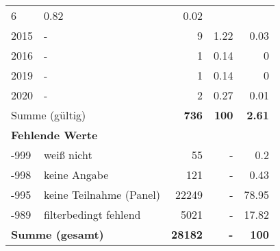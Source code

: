 \begin{longtable}{lXrrr}
       \num{6} &
       \num[round-mode=places,round-precision=2]{0.82} &
         \num[round-mode=places,round-precision=2]{0.02} \\

     2015 &
     \multicolumn{1}{X}{ -  } &


       \num{9} &
       \num[round-mode=places,round-precision=2]{1.22} &
         \num[round-mode=places,round-precision=2]{0.03} \\

     2016 &
     \multicolumn{1}{X}{ -  } &


       \num{1} &
       \num[round-mode=places,round-precision=2]{0.14} &
         \num[round-mode=places,round-precision=2]{0} \\

     2019 &
     \multicolumn{1}{X}{ -  } &


       \num{1} &
       \num[round-mode=places,round-precision=2]{0.14} &
         \num[round-mode=places,round-precision=2]{0} \\

     2020 &
     \multicolumn{1}{X}{ -  } &


       \num{2} &
       \num[round-mode=places,round-precision=2]{0.27} &
         \num[round-mode=places,round-precision=2]{0.01} \\
     \midrule
     \multicolumn{2}{l}{Summe (gültig)} &
       \textbf{\num{736}} &
     \textbf{100} &
       \textbf{\num[round-mode=places,round-precision=2]{2.61}} \\
     \multicolumn{5}{l}{\textbf{Fehlende Werte}}\\
       -999 &
       weiß nicht &
         \num{55} &
        - &
         \num[round-mode=places,round-precision=2]{0.2} \\
       -998 &
       keine Angabe &
         \num{121} &
        - &
         \num[round-mode=places,round-precision=2]{0.43} \\
       -995 &
       keine Teilnahme (Panel) &
         \num{22249} &
        - &
         \num[round-mode=places,round-precision=2]{78.95} \\
       -989 &
       filterbedingt fehlend &
         \num{5021} &
        - &
         \num[round-mode=places,round-precision=2]{17.82} \\
     \midrule
     \multicolumn{2}{l}{\textbf{Summe (gesamt)}} &
          \textbf{\num{28182}} &
        \textbf{-} &
        \textbf{100} \\
     \bottomrule
     \end{longtable}
     
